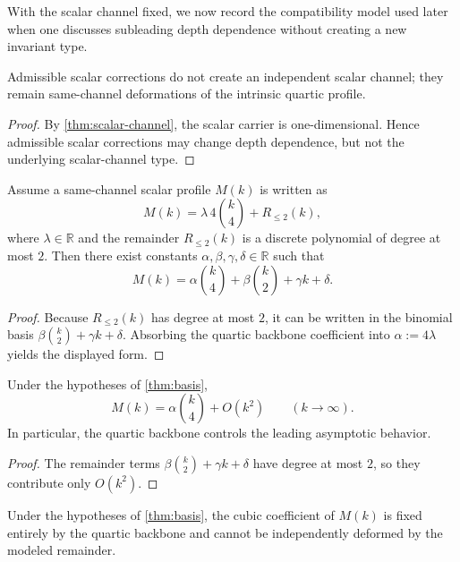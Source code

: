 With the scalar channel fixed, we now record the compatibility model
used later when one discusses subleading depth dependence without
creating a new invariant type.

\begin{theorem}
\label{thm:no-new}
Admissible scalar corrections do not create an independent scalar channel;
they remain same-channel deformations of the intrinsic quartic profile.
\end{theorem}

\begin{proof}
By \cref{thm:scalar-channel}, the scalar carrier is one-dimensional.
Hence admissible scalar corrections may change depth dependence, but not the
underlying scalar-channel type.
\end{proof}

\begin{theorem}
\label{thm:basis}
Assume a same-channel scalar profile \(M(k)\) is written as
\[
  M(k)=\lambda\,4\binom{k}{4}+R_{\le2}(k),
\]
where \(\lambda\in\mathbb R\) and the remainder \(R_{\le2}(k)\) is a discrete
polynomial of degree at most \(2\).
Then there exist constants \(\alpha,\beta,\gamma,\delta\in\mathbb R\)
such that
\[
  M(k)
  =
  \alpha\binom{k}{4}
  +
  \beta\binom{k}{2}
  +
  \gamma k
  +
  \delta.
\]
\end{theorem}

\begin{proof}
Because \(R_{\le2}(k)\) has degree at most \(2\), it can be written in the
binomial basis \(\beta\binom{k}{2}+\gamma k+\delta\).
Absorbing the quartic backbone coefficient into
\(\alpha:=4\lambda\) yields the displayed form.
\end{proof}

\begin{proposition}
\label{prop:leading-structure}
Under the hypotheses of \cref{thm:basis},
\[
  M(k)=\alpha\binom{k}{4}+O(k^2)
  \qquad (k\to\infty).
\]
In particular, the quartic backbone controls the leading asymptotic
behavior.
\end{proposition}

\begin{proof}
The remainder terms \(\beta\binom{k}{2}+\gamma k+\delta\) have degree
at most \(2\), so they contribute only \(O(k^2)\).
\end{proof}

\begin{theorem}
\label{thm:cubic}
Under the hypotheses of \cref{thm:basis}, the cubic coefficient of
\(M(k)\) is fixed entirely by the quartic backbone and cannot be
independently deformed by the modeled remainder.
\end{theorem}

